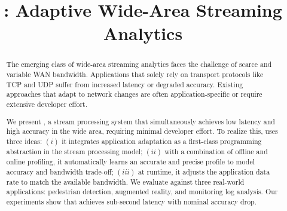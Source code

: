 \documentclass[sigplan,10pt,anonymous]{acmart}\settopmatter{printfolios=true}
\begin{document}


\title{\sysname{}: Adaptive Wide-Area Streaming Analytics}
\gdef\addresses{Paper \textbf{\#200}, 12 pages}

\begin{abstract}
  The emerging class of wide-area streaming analytics faces the challenge of
  scarce and variable WAN bandwidth. Applications that solely rely on
  transport protocols like TCP and UDP suffer from increased latency or degraded
  accuracy. Existing approaches that adapt to network changes are often
  application-specific or require extensive developer effort.

  We present \sysname{}, a stream processing system that simultaneously achieves
  low latency and high accuracy in the wide area, requiring minimal developer
  effort. To realize this, \sysname{} uses three ideas: $(i)$ it integrates
  application adaptation as a first-class programming abstraction in the stream
  processing model; $(ii)$ with a combination of offline and online profiling,
  it automatically learns an accurate and precise profile to model accuracy and
  bandwidth trade-off; $(iii)$ at runtime, it adjusts the application data rate
  to match the available bandwidth. We evaluate \sysname{} against three
  real-world applications: pedestrian detection, augmented reality, and
  monitoring log analysis. Our experiments show that \sysname{} achieves
  sub-second latency with nominal accuracy drop.
\end{abstract}

\maketitle











\def \bibfont {\normalsize}

\end{document}

